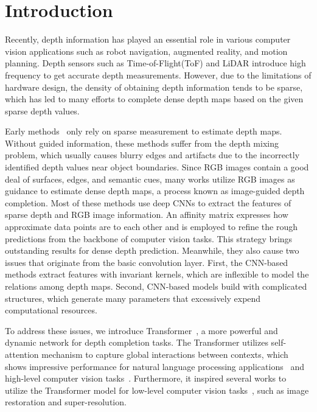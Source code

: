\documentclass[conference]{IEEEtran}
\begin{document}
\section{Introduction}
Recently, depth information has played an essential role in various computer vision applications such as robot navigation, augmented reality, and motion planning. Depth sensors such as Time-of-Flight(ToF) and LiDAR introduce high frequency to get accurate depth measurements.  
However, due to the limitations of hardware design, the density of obtaining depth information tends to be sparse, which has led to many efforts to complete dense depth maps based on the given sparse depth values.

Early methods~\cite{b1,b2} only rely on sparse measurement to estimate depth maps. Without guided information, these methods suffer from the depth mixing problem, which usually causes blurry edges and artifacts due to the incorrectly identified depth values near object boundaries. 
Since RGB images contain a good deal of surfaces, edges, and semantic cues, many works utilize RGB images as guidance to estimate dense depth maps, a process known as image-guided depth completion. 
Most of these methods use deep CNNs to extract the features of sparse depth and RGB image information. 
An affinity matrix expresses how approximate data points are to each other and is employed to refine the rough predictions from the backbone of computer vision tasks. This strategy brings outstanding results for dense depth prediction. 
Meanwhile, they also cause two issues that originate from the basic convolution layer. 
First, the CNN-based methods extract features with invariant kernels, which are inflexible to model the relations among depth maps.
Second, CNN-based models build with complicated structures, which generate many parameters that excessively expend computational resources.

To address these issues, we introduce Transformer~\cite{b3}, a more powerful and dynamic network for depth completion tasks. The Transformer utilizes self-attention mechanism to capture global interactions between contexts, which shows impressive performance for natural language processing applications~\cite{b4,b5} and high-level computer vision tasks~\cite{b6,b7,b8}. Furthermore, 
it inspired several works to utilize the Transformer model for low-level computer vision tasks~\cite{b9,b10,b11,b12}, such as image restoration and super-resolution.
\end{document}
